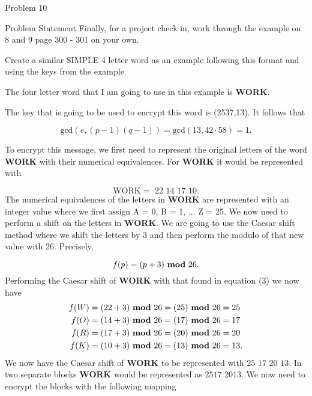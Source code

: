 \begin{problem}{Problem 10}
    \begin{statement}{Problem Statement}
        Finally, for a project check in, work through the example on 8 and 9 page 300 - 301 on your own. \vspace*{1em}

        Create a similar SIMPLE 4 letter word as an example following this format and using the keys from the example.
    \end{statement}

    \begin{highlight}[Solution]
        The four letter word that I am going to use in this example is \textbf{WORK}. \vspace*{1em}

        The key that is going to be used to encrypt this word is (2537,13). It follows that

        \setcounter{equation}{0}
        \begin{equation}
            \text{gcd}(e,(p-1)(q-1)) = \text{gcd}(13,42 \cdot 58) = 1.
        \end{equation}

        To encrypt this message, we first need to represent the original letters of the word \textbf{WORK} with their numerical equivalences. For \textbf{WORK} it would be represented with

        \begin{equation}
            \text{WORK} = \text{ 22 14 17 10}.
        \end{equation}
        The numerical equivalences of the letters in \textbf{WORK} are represented with an integer value where we first assign A = 0, B = 1, $\dots$ Z = 25. We now need to perform a shift on the letters
        in \textbf{WORK}. We are going to use the Caesar shift method where we shift the letters by 3 and then perform the modulo of that new value with 26. Precisely,

        \begin{equation}
            f(p) = (p + 3) \text{ \textbf{mod} } 26.
        \end{equation}
        Performing the Caesar shift of \textbf{WORK} with that found in equation (3) we now have
        \begin{align}
            f(W) & = (22 + 3) \text{ \textbf{mod} } 26 = (25) \text{ \textbf{mod} } 26 = 25 \\
            f(O) & = (14 + 3) \text{ \textbf{mod} } 26 = (17) \text{ \textbf{mod} } 26 = 17 \\
            f(R) & = (17 + 3) \text{ \textbf{mod} } 26 = (20) \text{ \textbf{mod} } 26 = 20 \\
            f(K) & = (10 + 3) \text{ \textbf{mod} } 26 = (13) \text{ \textbf{mod} } 26 = 13.
        \end{align}
        We now have the Caesar shift of \textbf{WORK} to be represented with $\text{25 17 20 13}$. In two separate blocks \textbf{WORK} would be represented as $\text{2517 2013}$. We now need to
        encrypt the blocks with the following mapping


\end{highlight}
\end{problem}
